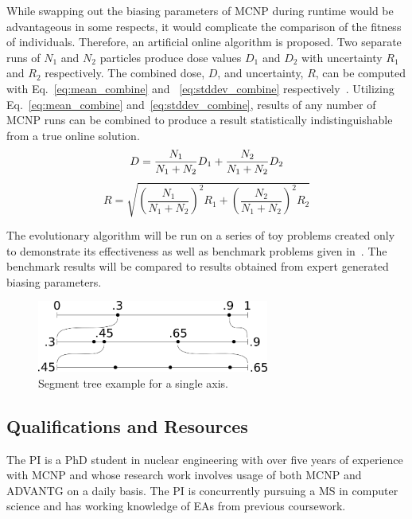 \documentclass{article}
\begin{document}
While swapping out the biasing parameters of MCNP during runtime would be advantageous in some respects, it would complicate the comparison of the fitness of individuals. Therefore, an artificial online algorithm is proposed. Two separate runs of $N_1$ and $N_2$ particles produce dose values $D_1$ and $D_2$ with uncertainty $R_1$ and $R_2$ respectively. The combined dose, $D$, and uncertainty, $R$, can be computed with Eq.~\ref{eq:mean_combine} and ~\ref{eq:stddev_combine} respectively~\cite{ref:knoll2000}. Utilizing Eq.~\ref{eq:mean_combine} and~\ref{eq:stddev_combine}, results of any number of MCNP runs can be combined to produce a result statistically indistinguishable from a true online solution.
\begin{equation}\label{eq:mean_combine}
D = \frac{N_1}{N_1 + N_2} D_1 + \frac{N_2}{N_1 + N_2} D_2 \\
\end{equation}
\begin{equation}\label{eq:stddev_combine}
R = \sqrt{\left( \frac{N_1}{N_1 + N_2}\right)^2 R_1 + \left( \frac{N_2}{N_1 + N_2}\right)^2 R_2}
\end{equation}

The evolutionary algorithm will be run on a series of toy problems created only to demonstrate its effectiveness as well as benchmark problems given in~\cite{ref:Mosher2015}. The benchmark results will be compared to results obtained from expert generated biasing parameters.

\begin{figure}
    \centering
    \includegraphics[width=3.0in]{treeex}
    \caption{Segment tree example for a single axis.}
    \label{fig:segtree}
\end{figure}

\subsection{Qualifications and Resources}\label{sec:b4}
The PI is a PhD student in nuclear engineering with over five years of experience with MCNP and whose research work involves usage of both MCNP and ADVANTG on a daily basis. The PI is concurrently pursuing a MS in computer science and has working knowledge of EAs from previous coursework.
\end{document}
